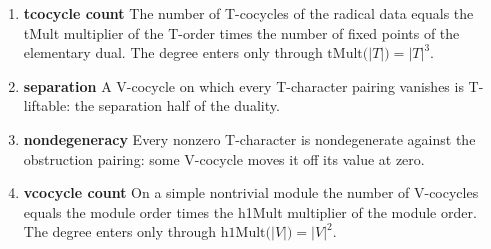 \begin{enumerate}
\item[(1)] \textbf{tcocycle count} The number of T-cocycles of the radical data equals the tMult multiplier of the T-order times the number of fixed points of the elementary dual. The degree enters only through $\mathrm{tMult}\bigl(\lvert T\rvert\bigr)=\lvert T\rvert^{3}$.
\item[(2)] \textbf{separation} A V-cocycle on which every T-character pairing vanishes is T-liftable: the separation half of the duality.
\item[(3)] \textbf{nondegeneracy} Every nonzero T-character is nondegenerate against the obstruction pairing: some V-cocycle moves it off its value at zero.
\item[(4)] \textbf{vcocycle count} On a simple nontrivial module the number of V-cocycles equals the module order times the h1Mult multiplier of the module order. The degree enters only through $\mathrm{h1Mult}\bigl(\lvert V\rvert\bigr)=\lvert V\rvert^{2}$.
\end{enumerate}
